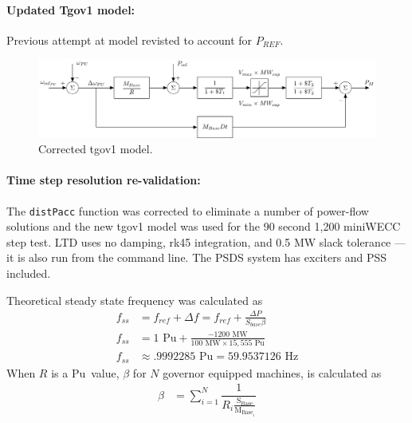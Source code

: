 \documentclass[12pt]{article}
\begin{document}
\paragraph{Updated Tgov1 model:} Previous attempt at model revisted to account for $P_{REF}$.
	\begin{figure}[h!]
			\centering
			\includegraphics[width=\linewidth]{tgov1}\vspace{-.5em}
			\caption{Corrected tgov1 model.}
			\label{tgov1}		 
	\end{figure}\vspace{-.5em}
\vspace{-1em}

\paragraph{Time step resolution re-validation:} The \verb|distPacc| function was corrected to eliminate a number of power-flow solutions and the new tgov1 model was used for the 90 second 1,200 miniWECC step test.
LTD uses no damping, rk45 integration, and 0.5 MW slack tolerance --- it is also run from the command line.
The PSDS system has exciters and PSS included.

\newcommand{\mw}{\ensuremath{\text{ MW}}}
\newcommand{\hz}{\ensuremath{\text{ Hz}}}
\newcommand{\pu}{\ensuremath{\text{ Pu}}}
\newcommand{\sbase}{\ensuremath{\text{S}_{\text{Base}}}}
\newcommand{\fbase}{\ensuremath{f_{\text{Base}}}}
\newcommand{\mbase}[1]{\ensuremath{\text{M}_{\text{Base}_{#1}}}}
\newcommand{\hsys}{\ensuremath{\text{ H}_{\text{sys}}}}
Theoretical steady state frequency was calculated as
\begin{align*}
f_{ss} &= f_{ref}+\Delta f = f_{ref} + \frac{\Delta P}{S_{base}\beta} \\
f_{ss} &= 1\pu + \frac{-1200\mw}{100\mw \times 15,555\pu} \\
f_{ss} &\approx .9992285\pu = 59.9537126\hz 
\end{align*}
When $R$ is a\pu\ value, $\beta$ for $N$ governor equipped machines, is calculated as
\begin{align*}
\beta &= \sum_{i=1}^{N} \dfrac{1}{R_i \frac{\sbase}{\mbase{i}}}
\end{align*}
\end{document}
